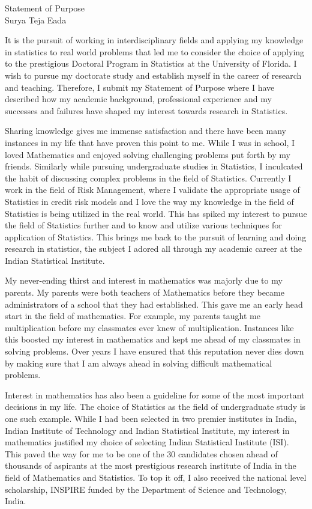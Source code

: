 \documentclass[12pt]{article}
\begin{document}
\begin{center}
{\Large Statement of Purpose} \\[.1in]
{\large Surya Teja Eada} 
\end{center}

\vspace*{.5in}

\text It is the pursuit of working in interdisciplinary fields and applying my knowledge in statistics to real world problems that led me to consider the choice of applying to the prestigious Doctoral Program in Statistics at the University of Florida. I wish to pursue my doctorate study and establish myself in the career of research and teaching. Therefore, I submit my Statement of Purpose where I have described how my academic background, professional experience and my successes and failures have shaped my interest towards research in Statistics.

Sharing knowledge gives me immense satisfaction and there have been many instances in my life that have proven this point to me. While I was in school, I loved Mathematics and enjoyed solving challenging problems put forth by my friends. Similarly while pursuing undergraduate studies in Statistics, I inculcated the habit of discussing complex problems in the field of Statistics. Currently I work in the field of Risk Management, where I validate the appropriate usage of Statistics in credit risk models and I love the way my knowledge in the field of Statistics is being utilized in the real world. This has spiked my interest to pursue the field of Statistics further and to know and utilize various techniques for application of Statistics. This brings me back to the pursuit of learning and doing research in statistics, the subject I adored all through my academic career at the Indian Statistical Institute.

My never-ending thirst and interest in mathematics was majorly due to my parents. My parents were both teachers of Mathematics before they became administrators of a school that they had established. This gave me an early head start in the field of mathematics. For example, my parents taught me multiplication before my classmates ever knew of multiplication. Instances like this boosted my interest in mathematics and kept me ahead of my classmates in solving problems. Over years I have ensured that this reputation never dies down by making sure that I am always ahead in solving difficult mathematical problems. 

Interest in mathematics has also been a guideline for some of the most important decisions in my life. The choice of Statistics as the field of undergraduate study is one such example. While I had been selected in two premier institutes in India, Indian Institute of Technology and Indian Statistical Institute, my interest in mathematics justified my choice of selecting Indian Statistical Institute (ISI). This paved the way for me to be one of the 30 candidates chosen ahead of thousands of aspirants at the most prestigious research institute of India in the field of Mathematics and Statistics. To top it off, I also received the national level scholarship, INSPIRE funded by the Department of Science and Technology, India.
\end{document}
